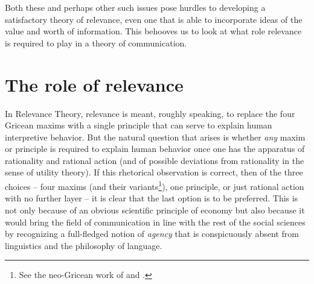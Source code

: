 Both these and perhaps other such issues pose hurdles to developing a satisfactory theory of relevance, even one that is able to incorporate ideas of the value and worth of information. This behooves us to look at what role relevance is required to play in a theory of communication.


\section{The role of relevance} \label{sec:role of relevance}

In Relevance Theory, relevance is meant, roughly speaking, to replace the four Gricean maxims \citep{grice:lc, grice:landc} with a single principle that can serve to explain human interpretive behavior. But the natural question that arises is whether \emph{any} maxim or principle is required to explain human behavior once one has the apparatus of rationality and rational action (and of possible deviations from rationality in the sense of utility theory). If this rhetorical observation is correct, then of the three choices -- four maxims (and their variants\footnote{See the neo-Gricean work of \citet{horn:qr} and \citet{levinson:pm}.}), one principle, or just rational action with no further layer -- it is clear that the last option is to be preferred. This is not only because of an obvious scientific principle of economy but also because it would bring the field of communication in line with the rest of the social sciences by recognizing a full-fledged notion of \emph{agency} that is conspicuously absent from linguistics and the philosophy of language. 


